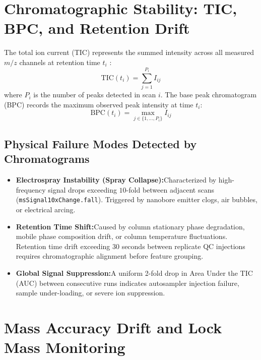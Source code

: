 \documentclass[11pt,twoside,openright]{book}
\begin{document}
\section{Chromatographic Stability: TIC, BPC, and Retention Drift}
\label{sec:chromatographic_stability}

The total ion current (TIC) represents the summed intensity across all measured $m/z$ channels at retention time $t_i$ \cite{broadhurst2018guidelines, want2010global}:
\begin{equation}
\text{TIC}(t_i) = \sum_{j=1}^{P_i} I_{ij}
\end{equation}
where $P_i$ is the number of peaks detected in scan $i$. The base peak chromatogram (BPC) records the maximum observed peak intensity at time $t_i$:
\begin{equation}
\text{BPC}(t_i) = \max_{j \in \{1, \dots, P_i\}} I_{ij}
\end{equation}

\subsection{Physical Failure Modes Detected by Chromatograms}

\begin{itemize}
    \item \textbf{Electrospray Instability (Spray Collapse):}\enspace Characterized by high-frequency signal drops exceeding $10$-fold between adjacent scans (\texttt{msSignal10xChange.fall}). Triggered by nanobore emitter clogs, air bubbles, or electrical arcing.
    \item \textbf{Retention Time Shift:}\enspace Caused by column stationary phase degradation, mobile phase composition drift, or column temperature fluctuations. Retention time drift exceeding $30$ seconds between replicate QC injections requires chromatographic alignment before feature grouping.
    \item \textbf{Global Signal Suppression:}\enspace A uniform 2-fold drop in Area Under the TIC (AUC) between consecutive runs indicates autosampler injection failure, sample under-loading, or severe ion suppression.
\end{itemize}

\section{Mass Accuracy Drift and Lock Mass Monitoring}
\label{sec:mass_accuracy_drift}
\end{document}
